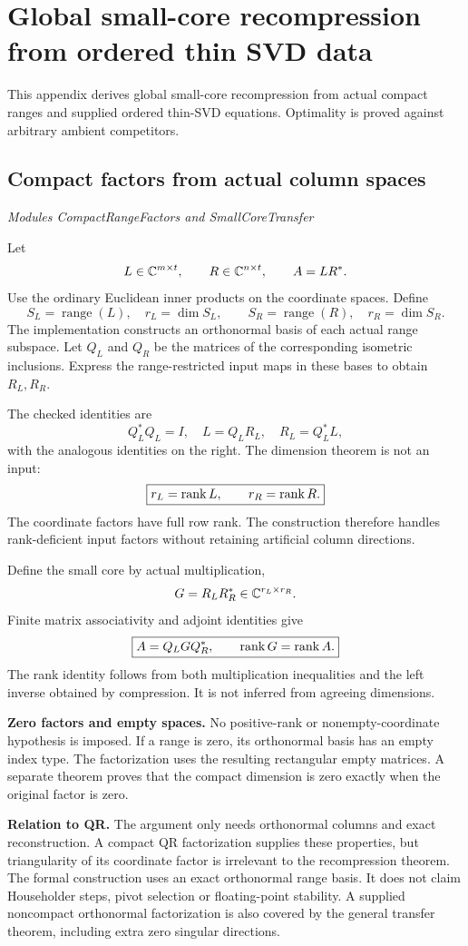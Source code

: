 \clearpage\FloatBarrier\section{Global small-core recompression from ordered thin SVD data}\label{supp6:section:001}
This appendix derives global small-core recompression from actual compact ranges and supplied ordered thin-SVD equations. Optimality is proved against arbitrary ambient competitors.\par

\subsection{Compact factors from actual column spaces}\label{supp6:subsection:001}\textit{Modules CompactRangeFactors and SmallCoreTransfer}\par
Let
\[
L\in\C^{m\times t},\qquad R\in\C^{n\times t},\qquad A=LR^*.
\]
Use the ordinary Euclidean inner products on the coordinate spaces. Define
\[
S_L=\operatorname{range}(L),\quad r_L=\dim S_L,
\qquad S_R=\operatorname{range}(R),\quad r_R=\dim S_R.
\]
The implementation constructs an orthonormal basis of each actual range subspace. Let $Q_L$ and $Q_R$ be the matrices of the corresponding isometric inclusions. Express the range-restricted input maps in these bases to obtain $R_L,R_R$.

The checked identities are
\[
\boxed{Q_L^*Q_L=I,\quad L=Q_LR_L,\quad R_L=Q_L^*L,}
\]
with the analogous identities on the right. The dimension theorem is not an input:
\[
\boxed{r_L=\operatorname{rank} L,\qquad r_R=\operatorname{rank} R.}
\]
The coordinate factors have full row rank. The construction therefore handles rank-deficient input factors without retaining artificial column directions.

Define the small core by actual multiplication,
\[
G=R_LR_R^*\in\C^{r_L\times r_R}.
\]
Finite matrix associativity and adjoint identities give
\[
\boxed{A=Q_LGQ_R^*,\qquad \operatorname{rank} G=\operatorname{rank} A.}
\]
The rank identity follows from both multiplication inequalities and the left inverse obtained by compression. It is not inferred from agreeing dimensions.

\textbf{Zero factors and empty spaces.} No positive-rank or nonempty-coordinate hypothesis is imposed. If a range is zero, its orthonormal basis has an empty index type. The factorization uses the resulting rectangular empty matrices. A separate theorem proves that the compact dimension is zero exactly when the original factor is zero.

\textbf{Relation to QR.} The argument only needs orthonormal columns and exact reconstruction. A compact QR factorization supplies these properties, but triangularity of its coordinate factor is irrelevant to the recompression theorem. The formal construction uses an exact orthonormal range basis. It does not claim Householder steps, pivot selection or floating-point stability. A supplied noncompact orthonormal factorization is also covered by the general transfer theorem, including extra zero singular directions.



